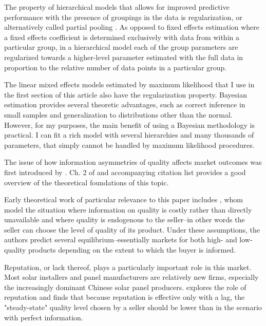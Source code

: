 \documentclass[a4paper]{article}
\begin{document}



The property of hierarchical models that allows for improved predictive performance with the presence of groupings in the data is regularization, or alternatively called partial pooling \citep{gelman_bayesian_2013}. As opposed to fixed effects estimation where a fixed effects coefficient is determined exclusively with data from within a particular group, in a hierarchical model each of the group parameters are regularized towards a higher-level parameter estimated with the full data in proportion to the relative number of data points in a particular group.

The linear mixed effects models estimated by maximum likelihood that I use in the first section of this article also have the regularization property. Bayesian estimation provides several theoretic advantages, such as correct inference in small samples and generalization to distributions other than the normal. However, for my purposes, the main benefit of using a Bayesian methodology is practical. I can fit a rich model with several hierarchies and many thousands of parameters, that simply cannot be handled by maximum likelihood procedures.

The issue of how information asymmetries of quality affects market outcomes was first introduced by \citet{akerlof_market_1970}. Ch. 2 of \citet{tirole_theory_1988} and accompanying citation list provides a good overview of the theoretical foundations of this topic.

Early theoretical work of particular relevance to this paper includes \citet{chan_prices_1982}, whom model the situation where information on quality is costly rather than directly unavailable and where quality is endogenous to the seller--in other words the seller can choose the level of quality of its product. Under these assumptions, the authors predict several equilibrium--essentially markets for both high- and low-quality products depending on the extent to which the buyer is informed.

Reputation, or lack thereof, plays a particularly important role in this market. Most solar installers and panel manufacturers are relatively new firms, especially the increasingly dominant Chinese solar panel producers. \citet{shapiro_consumer_1982} explores the role of reputation and finds that because reputation is effective only with a lag, the "steady-state" quality level chosen by a seller should be lower than in the scenario with perfect information.
\end{document}
